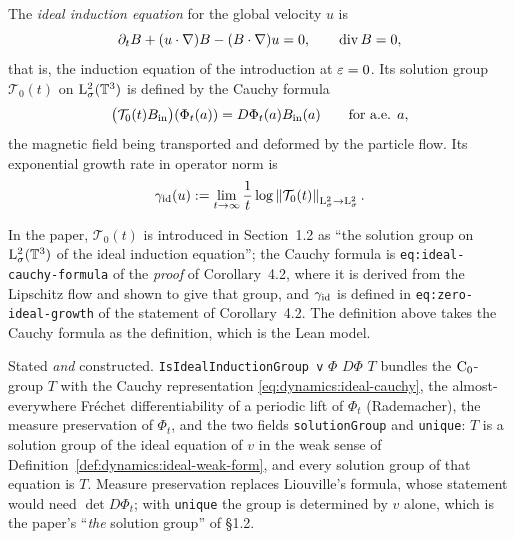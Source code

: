 \begin{definition}
  \label{def:dynamics:ideal-induction-group}
  \leanok
  The \emph{ideal induction equation} for the global velocity $u $ is
  \[
    \partial_tB+(u\cdot\nabla)B-(B\cdot\nabla)u=0,
    \qquad\operatorname{div} B=0,
  \]
  that is, the induction equation of the introduction at $\varepsilon=0 $.  Its solution group
  $\mathcal T_0(t) $ on $\mathrm{L}^2_\sigma(\mathbb{T}^3) $ is defined by the Cauchy formula
  \begin{equation}
    \bigl(\mathcal T_0(t)B_{\rm in}\bigr)(\Phi_t(a))
    =D\Phi_t(a)B_{\rm in}(a)
    \qquad\text{for a.e. }a,
    \label{eq:dynamics:ideal-cauchy}
  \end{equation}
  the magnetic field being transported and deformed by the particle flow.  Its
  exponential growth rate in operator norm is
  \begin{equation}
    \gamma_{\rm id}(u)
    :=\lim_{t\to\infty}\frac1t
    \log\left\|\mathcal T_0(t)\right\|_{\mathrm{L}^2_\sigma\to\mathrm{L}^2_\sigma}.
    \label{eq:dynamics:ideal-rate}
  \end{equation}
\end{definition}

In the paper, $\mathcal T_0(t) $ is introduced in Section~1.2 as ``the solution group on
$\mathrm{L}^2_\sigma(\mathbb{T}^3) $ of the ideal induction equation''; the Cauchy formula is
\texttt{eq:ideal-cauchy-formula} of the \emph{proof} of Corollary~4.2, where it is derived from
the Lipschitz flow and shown to give that group, and $\gamma_{\rm id} $ is defined in
\texttt{eq:zero-ideal-growth} of the statement of Corollary~4.2.  The definition above takes
the Cauchy formula as the definition, which is the Lean model.

Stated \emph{and} constructed.  \texttt{IsIdealInductionGroup v} $\Phi$ $D\Phi$ $T$ bundles the
$\mathrm{C}_0$-group $T$ with the Cauchy representation \eqref{eq:dynamics:ideal-cauchy}, the
almost-everywhere Fr\'echet differentiability of a periodic lift of $\Phi_t$ (Rademacher),
the measure preservation of $\Phi_t$, and the two fields \texttt{solutionGroup} and
\texttt{unique}: $T$ is a solution group of the ideal equation of $v$ in the weak sense of
Definition~\ref{def:dynamics:ideal-weak-form}, and every solution group of that equation is
$T$.  Measure preservation replaces Liouville's formula, whose statement would need
$\det D\Phi_t$; with \texttt{unique} the group is determined by $v$ alone, which is the
paper's ``\emph{the} solution group'' of §1.2.

